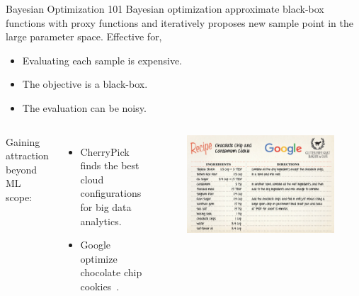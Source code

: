 \begin{frame}{Bayesian Optimization 101}
  Bayesian optimization approximate black-box functions with proxy functions and
  iteratively proposes new sample point in the large parameter space. Effective
  for,

  \begin{itemize}
    \item Evaluating each sample is expensive.
    \item The objective is a black-box.
    \item The evaluation can be noisy.
  \end{itemize}
  \pause
  \begin{columns}
    \footnotesize
    Gaining attraction beyond ML scope:

    \begin{itemize}
    \item CherryPick~\cite{alipourfard2017cherrypick} finds the best cloud
      configurations for big data analytics.
    \item Google optimize chocolate chip cookies~\cite{solnik2017bayesian}.
    \end{itemize}

    \pause
    \begin{figure}
      \includegraphics[width=\linewidth]{figures/google-cookie.jpg}
    \end{figure}
  \end{columns}
\end{frame}

